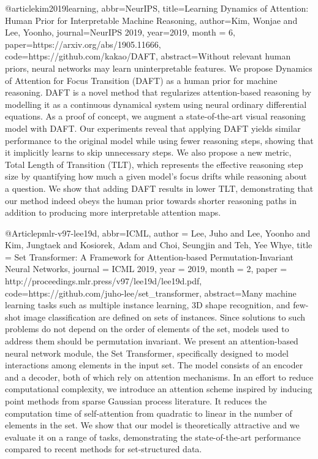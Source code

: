 @article{kim2019learning,
  abbr={NeurIPS},
  title={Learning Dynamics of Attention: Human Prior for Interpretable Machine Reasoning},
  author={Kim, Wonjae and Lee, Yoonho},
  journal={NeurIPS 2019},
  year={2019},
  month = {6},
  paper={https://arxiv.org/abs/1905.11666},
  code={https://github.com/kakao/DAFT},
  abstract={Without relevant human priors, neural networks may learn uninterpretable features. We propose Dynamics of Attention for Focus Transition (DAFT) as a human prior for machine reasoning. DAFT is a novel method that regularizes attention-based reasoning by modelling it as a continuous dynamical system using neural ordinary differential equations. As a proof of concept, we augment a state-of-the-art visual reasoning model with DAFT. Our experiments reveal that applying DAFT yields similar performance to the original model while using fewer reasoning steps, showing that it implicitly learns to skip unnecessary steps. We also propose a new metric, Total Length of Transition (TLT), which represents the effective reasoning step size by quantifying how much a given model's focus drifts while reasoning about a question. We show that adding DAFT results in lower TLT, demonstrating that our method indeed obeys the human prior towards shorter reasoning paths in addition to producing more interpretable attention maps.}
}

@Article{pmlr-v97-lee19d,
  abbr={ICML},
  author    = {Lee, Juho and Lee, Yoonho and Kim, Jungtaek and Kosiorek, Adam and Choi, Seungjin and Teh, Yee Whye},
  title     = {Set Transformer: A Framework for Attention-based Permutation-Invariant Neural Networks},
  journal = {ICML 2019},
  year      = {2019},
  month = {2},
  paper = {http://proceedings.mlr.press/v97/lee19d/lee19d.pdf},
  code={https://github.com/juho-lee/set_transformer},
  abstract={Many machine learning tasks such as multiple instance learning, 3D shape recognition, and few-shot image classification are defined on sets of instances. Since solutions to such problems do not depend on the order of elements of the set, models used to address them should be permutation invariant. We present an attention-based neural network module, the Set Transformer, specifically designed to model interactions among elements in the input set. The model consists of an encoder and a decoder, both of which rely on attention mechanisms. In an effort to reduce computational complexity, we introduce an attention scheme inspired by inducing point methods from sparse Gaussian process literature. It reduces the computation time of self-attention from quadratic to linear in the number of elements in the set. We show that our model is theoretically attractive and we evaluate it on a range of tasks, demonstrating the state-of-the-art performance compared to recent methods for set-structured data.}
}

